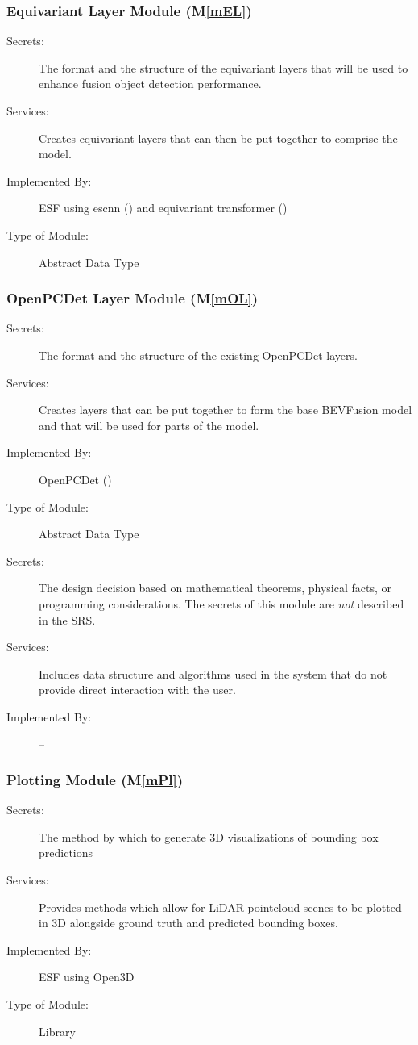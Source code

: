 \documentclass[12pt, titlepage]{article}
\newcommand{\ProjectName}{ESF }
\newcommand{\mref}[1]{M\ref{#1}}
\begin{document}
\subsubsection{Equivariant Layer Module (\mref{mEL})}
\begin{description}
\item[Secrets:] The format and the structure of the equivariant layers that will be used to enhance fusion object detection performance.
\item[Services:] Creates equivariant layers that can then be put together to comprise the model. 
\item[Implemented By:] \ProjectName{} using escnn (\cite{cesa2022a}) and equivariant transformer (\cite{tai2019equivariant})
\item[Type of Module:] Abstract Data Type
\end{description}

\subsubsection{OpenPCDet Layer Module (\mref{mOL})}
\begin{description}
\item[Secrets:] The format and the structure of the existing OpenPCDet layers.
\item[Services:] Creates layers that can be put together to form the base BEVFusion model and that will be used for parts of the model.
\item[Implemented By:] OpenPCDet (\cite{openpcdet2020})
\item[Type of Module:] Abstract Data Type
\end{description}

\begin{description}
\item[Secrets:] The design decision based on mathematical theorems, physical
  facts, or programming considerations. The secrets of this module are
  \emph{not} described in the SRS.
\item[Services:] Includes data structure and algorithms used in the system that
  do not provide direct interaction with the user. 
\item[Implemented By:] --
\end{description}

\subsubsection{Plotting Module (\mref{mPl})}
\begin{description}
\item[Secrets:] The method by which to generate 3D visualizations of bounding box predictions
\item[Services:] Provides methods which allow for LiDAR pointcloud scenes to be plotted in 3D alongside ground truth and predicted bounding boxes. 
\item[Implemented By:] \ProjectName{} using Open3D
\item[Type of Module:] Library
\end{description}
\end{document}
